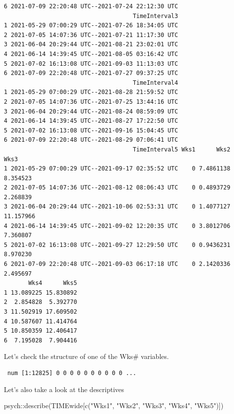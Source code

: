 \documentclass[
  11pt,
]{book}
\newenvironment{Shaded}{\begin{snugshade}}{\end{snugshade}}
\newcommand{\FunctionTok}[1]{\textcolor[rgb]{0.00,0.00,0.00}{#1}}
\newcommand{\NormalTok}[1]{#1}
\newcommand{\SpecialCharTok}[1]{\textcolor[rgb]{0.00,0.00,0.00}{#1}}
\newcommand{\StringTok}[1]{\textcolor[rgb]{0.31,0.60,0.02}{#1}}
\begin{document}
\begin{verbatim}
6 2021-07-09 22:20:48 UTC--2021-07-24 22:12:30 UTC
                                     TimeInterval3
1 2021-05-29 07:00:29 UTC--2021-07-26 18:34:05 UTC
2 2021-07-05 14:07:36 UTC--2021-07-21 11:17:30 UTC
3 2021-06-04 20:29:44 UTC--2021-08-21 23:02:01 UTC
4 2021-06-14 14:39:45 UTC--2021-08-05 03:16:42 UTC
5 2021-07-02 16:13:08 UTC--2021-09-03 11:13:03 UTC
6 2021-07-09 22:20:48 UTC--2021-07-27 09:37:25 UTC
                                     TimeInterval4
1 2021-05-29 07:00:29 UTC--2021-08-28 21:59:52 UTC
2 2021-07-05 14:07:36 UTC--2021-07-25 13:44:16 UTC
3 2021-06-04 20:29:44 UTC--2021-08-24 08:59:09 UTC
4 2021-06-14 14:39:45 UTC--2021-08-27 17:22:50 UTC
5 2021-07-02 16:13:08 UTC--2021-09-16 15:04:45 UTC
6 2021-07-09 22:20:48 UTC--2021-08-29 07:06:41 UTC
                                     TimeInterval5 Wks1      Wks2      Wks3
1 2021-05-29 07:00:29 UTC--2021-09-17 02:35:52 UTC    0 7.4861138  8.354523
2 2021-07-05 14:07:36 UTC--2021-08-12 08:06:43 UTC    0 0.4893729  2.268839
3 2021-06-04 20:29:44 UTC--2021-10-06 02:53:31 UTC    0 1.4077127 11.157966
4 2021-06-14 14:39:45 UTC--2021-09-02 12:20:35 UTC    0 3.8012706  7.360807
5 2021-07-02 16:13:08 UTC--2021-09-27 12:29:50 UTC    0 0.9436231  8.970230
6 2021-07-09 22:20:48 UTC--2021-09-03 06:17:18 UTC    0 2.1420336  2.495697
       Wks4      Wks5
1 13.089225 15.830892
2  2.854828  5.392770
3 11.502919 17.609502
4 10.587607 11.414764
5 10.850359 12.406417
6  7.195028  7.904416
\end{verbatim}

Let's check the structure of one of the Wks\# variables.

\begin{Shaded}
\end{Shaded}

\begin{verbatim}
 num [1:12825] 0 0 0 0 0 0 0 0 0 0 ...
\end{verbatim}

Let's also take a look at the descriptives

\begin{Shaded}
\begin{Highlighting}[]
\NormalTok{psych}\SpecialCharTok{::}\FunctionTok{describe}\NormalTok{(TIMEwide[}\FunctionTok{c}\NormalTok{(}\StringTok{"Wks1"}\NormalTok{, }\StringTok{"Wks2"}\NormalTok{, }\StringTok{"Wks3"}\NormalTok{, }\StringTok{"Wks4"}\NormalTok{, }\StringTok{"Wks5"}\NormalTok{)])}
\end{Highlighting}
\end{Shaded}
\end{document}

